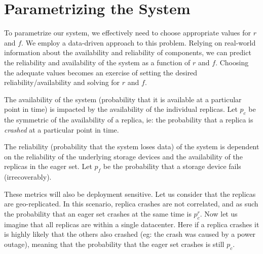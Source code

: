

\section{Parametrizing the System}\label{sec:r2s2parametrization}

To parametrize our system, we effectively need to choose
appropriate values for $r$ and $f$. We employ a data-driven
approach to this problem. Relying on real-world information about
the availability and reliability of components, we can predict
the reliability and availability of the system as a function of
$r$ and $f$. Choosing the adequate values becomes an exercise of
setting the desired reliability/availability and solving for $r$
and $f$.

The availability of the system (probability that it is available
at a particular point in time) is impacted by the availability of
the individual replicas. Let $p_c$ be the symmetric of the
availability of a replica, ie: the probability that a replica is
\emph{crashed} at a particular point in time.

The reliability (probability that the system loses data) of the
system is dependent on the reliability of the underlying storage
devices and the availability of the replicas in the eager set.
Let $p_f$ be the probability that a storage device fails
(irrecoverably).

These metrics will also be deployment sensitive. Let us consider
that the replicas are geo-replicated. In this scenario, replica
crashes are not correlated, and as such the probability that an
eager set crashes at the same time is $p_c^r$. Now let us imagine
that all replicas are within a single datacenter. Here if a
replica crashes it is highly likely that the others also crashed
(eg: the crash was caused by a power outage), meaning that the
probability that the eager set crashes is still $p_c$.

